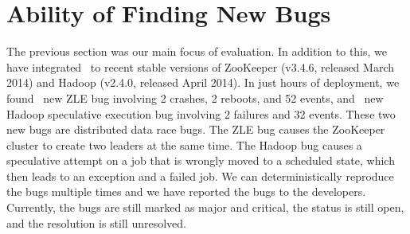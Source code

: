 

\section{Ability of Finding New Bugs}
\label{eval-newbugs}

The previous section was our main focus of evaluation.  In addition to
this, we have integrated \sampro\ to recent stable versions of ZooKeeper
(v3.4.6, released March 2014) and Hadoop (v2.4.0, released April 2014).  In
just hours of deployment, we found \numZkNewBugs\ new ZLE bug involving 2
crashes, 2 reboots, and 52 events, and \numMrNewBugs\ new Hadoop
speculative execution bug involving 2 failures and 32 events.  These two
new bugs are distributed data race bugs.  The ZLE bug causes the ZooKeeper
cluster to create two leaders at the same time.  The Hadoop bug causes a
speculative attempt on a job that is wrongly moved to a scheduled state,
which then leads to an exception and a failed job.  We can
deterministically reproduce the bugs multiple times and we have reported
the bugs to the developers.  Currently, the bugs are still marked as major
and critical, the status is still open, and the resolution is still
unresolved.




